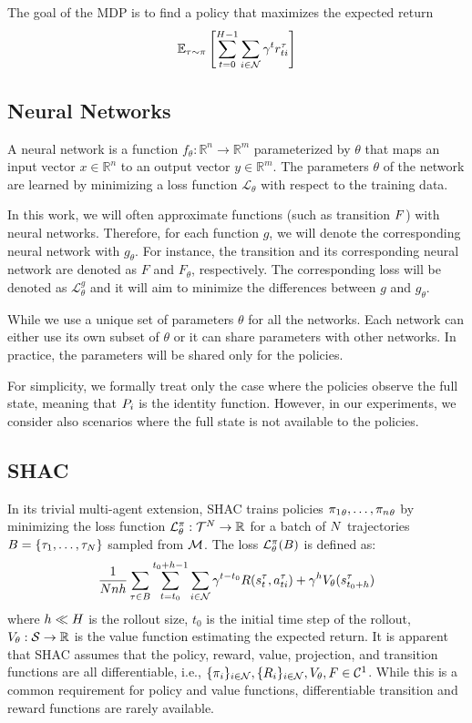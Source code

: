 The goal of the MDP is to find a policy that maximizes the expected return 
\[\mathbb{E}_{\tau\sim\pi}\left[\sum_{t=0}^{H-1}\sum_{i\in\mathcal{N}}\gamma^t r_{ti}^\tau \right]\]

\subsection{Neural Networks}
A neural network is a function $f_{\theta}:\mathbb{R}^n\rightarrow\mathbb{R}^m$ parameterized by $\theta$ that maps an input vector $x\in\mathbb{R}^n$ to an output vector $y\in\mathbb{R}^m$. The parameters $\theta$ of the network are learned by minimizing a loss function $\mathcal{L}_\theta$ with respect to the training data.

In this work, we will often approximate functions (such as transition $F$) with neural networks. Therefore, for each function $g$, we will denote the corresponding neural network with $g_\theta$. For instance, the transition and its corresponding neural network are denoted as $F$ and $F_{\theta}$, respectively. The corresponding loss will be denoted as $\mathcal{L}_\theta^g$ and it will aim to minimize the differences between $g$ and $g_\theta$.

While we use a unique set of parameters $\theta$ for all the networks. Each network can either use its own subset of $\theta$ or it can share parameters with other networks. In practice, the parameters will be shared only for the policies.

For simplicity, we formally treat only the case where the policies observe the full state, meaning that $P_{i}$ is the identity function. However, in our experiments, we consider also scenarios where the full state is not available to the policies.

\subsection{SHAC}

In its trivial multi-agent extension, SHAC trains policies ${\pi_1}_\theta,\dots,{\pi_n}_\theta$ by minimizing the loss function $\mathcal{L}_\theta^{\pi}:\mathcal{T}^N\rightarrow\mathbb{R}$ for a batch of $N$ trajectories $B = \{\tau_1, \ldots, \tau_N\}$ sampled from $\mathcal{M}$. The loss $\mathcal{L}_\theta^{\pi}(B)$ is defined as:  
\begin{equation*}\label{eq:shac}
    \frac{1}{Nnh}\sum_{\tau\in B} \sum_{t=t_0}^{t_0+h-1} \sum_{i\in\mathcal{N}} \gamma^{t-t_0} R(s_{t}^\tau, a_{ti}^\tau) + \gamma^h V_\theta(s^\tau_{t_0+h})
\end{equation*}
where $h \ll H$ is the rollout size, $t_0$ is the initial time step of the rollout, $V_\theta: \mathcal{S} \rightarrow \mathbb{R}$ is the value function estimating the expected return. It is apparent that SHAC assumes that the policy, reward, value, projection, and transition functions are all differentiable, i.e., $\{\pi_{i}\}_{i\in\mathcal{N}},\{R_{i}\}_{i\in\mathcal{N}},V_\theta,F \in \mathcal{C}^1$. While this is a common requirement for policy and value functions, differentiable transition and reward functions are rarely available. 

